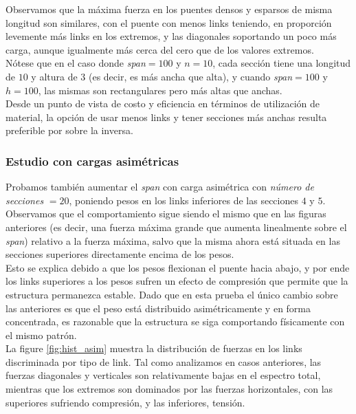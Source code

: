 Observamos que la máxima fuerza en los puentes densos y esparsos de misma longitud son similares, con el puente con menos links teniendo, en proporción levemente más links en los extremos, y las diagonales soportando un poco más carga, aunque igualmente más cerca del cero que de los valores extremos.\\

Nótese que en el caso donde \textit{span}$=100$ y $n=10$, cada sección tiene una longitud de $10$ y altura de $3$ (es decir, es más ancha que alta), y cuando \textit{span}$=100$ y $h=100$, las mismas son rectangulares pero más altas que anchas.\\

Desde un punto de vista de costo y eficiencia en términos de utilización de material, la opción de usar menos links y tener secciones más anchas resulta preferible por sobre la inversa.\\

\subsubsection{Estudio con cargas asimétricas}
Probamos también aumentar el \textit{span} con carga asimétrica con \textit{número de secciones} $=20$, poniendo pesos en los links inferiores de las secciones $4$ y $5$. Observamos que el comportamiento sigue siendo el mismo que en las figuras anteriores (es decir, una fuerza máxima grande que aumenta linealmente sobre el \textit{span}) relativo a la fuerza máxima, salvo que la misma ahora está situada en las secciones superiores directamente encima de los pesos.\\

Esto se explica debido a que los pesos flexionan el puente hacia abajo, y por ende los links superiores a los pesos sufren un efecto de compresión que permite que la estructura permanezca estable. Dado que en esta prueba el único cambio sobre las anteriores es que el peso está distribuido asimétricamente y en forma concentrada, es razonable que la estructura se siga comportando físicamente con el mismo patrón.\\

La figure \ref{fig:hist_asim} muestra la distribución de fuerzas en los links discriminada por tipo de link. Tal como analizamos en casos anteriores, las fuerzas diagonales y verticales son relativamente bajas en el espectro total, mientras que los extremos son dominados por las fuerzas horizontales, con las superiores sufriendo compresión, y las inferiores, tensión. 

